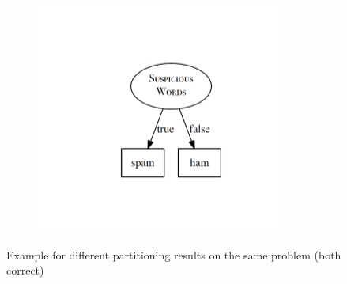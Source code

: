 \begin{figure}[h]
\begin{subfigure}{0.45\textwidth}
    \includegraphics[width=0.9\textwidth]{assets/trees/basics/part_example_good.png}
  \end{subfigure}
  \caption{Example for different partitioning results on the same problem (both correct)}
  \label{fig:3_partitioning_example}
\end{figure}
